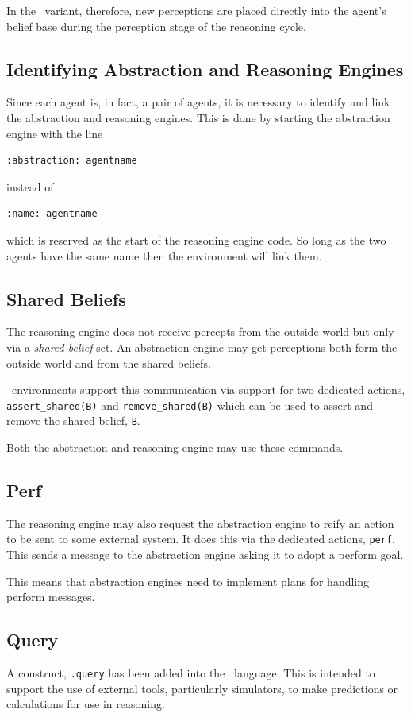 \documentclass[a4]{article}
\begin{document}
In the \eass\ variant, therefore, new perceptions are placed directly into the agent's belief base during the perception stage of the reasoning cycle.

\subsection{Identifying Abstraction and Reasoning Engines}
Since each agent is, in fact, a pair of agents, it is necessary to identify and link the abstraction and reasoning engines.  This is done by starting the abstraction engine with the line
\begin{verbatim}
:abstraction: agentname
\end{verbatim} 
instead of 
\begin{verbatim}
:name: agentname
\end{verbatim} 
which is reserved as the start of the reasoning engine code.  So long as the two agents have the same name then the environment will link them.

\subsection{Shared Beliefs}
The reasoning engine does not receive percepts from the outside world but only via a \emph{shared belief} set.  An abstraction engine may get perceptions both form the outside world and from the shared beliefs.

\eass\ environments support this communication via support for two dedicated actions, \lstinline{assert_shared(B)} and \lstinline{remove_shared(B)} which can be used to assert and remove the shared belief, \lstinline{B}.

Both the abstraction and reasoning engine may use these commands.

\subsection{Perf}
The reasoning engine may also request the abstraction engine to reify an action to be sent to some external system.  It does this via the dedicated actions, \texttt{perf}.  This sends a message to the abstraction engine asking it to adopt a perform goal.

This means that abstraction engines need to implement plans for handling perform messages.

\subsection{Query}
A construct, \texttt{.query} has been added into the \eass\ language.  This is intended to support the use of external tools, particularly simulators, to make predictions or calculations for use in reasoning.  
\end{document}
